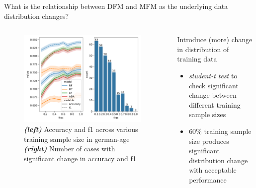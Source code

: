 \documentclass[aspectratio=169]{beamer}
\begin{document}
\begin{frame}{What is the relationship between DFM and MFM as the
  underlying data distribution changes?}
  \begin{columns}[t, onlytextwidth]
    \begin{figure}
      \centering
      \includegraphics[width=0.95\textwidth]{training-set-frac-threshold.pdf}
      \caption{\emph{\textbf{(left)}} Accuracy and f1 across various
        training sample size in german-age \emph{\textbf{(right)}} Number
        of cases with significant change in accuracy and f1}
      \label{fig:training-set-frac-threshold}
    \end{figure}

    \begin{block}{Introduce (more) change in distribution of training data}
      \begin{itemize}
        \item \emph{student-t test} to check significant change
          between different training sample sizes
        \item 60\% training sample size produces significant
          distribution change with acceptable performance
      \end{itemize}
    \end{block}
  \end{columns}
\end{frame}
\end{document}
